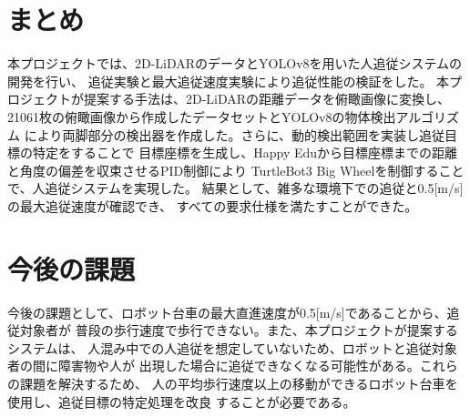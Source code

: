 \section{まとめ}
本プロジェクトでは、2D-LiDARのデータとYOLOv8を用いた人追従システムの開発を行い、
追従実験と最大追従速度実験により追従性能の検証をした。
本プロジェクトが提案する手法は、2D-LiDARの距離データを俯瞰画像に変換し、
21061枚の俯瞰画像から作成したデータセットとYOLOv8の物体検出アルゴリズム
により両脚部分の検出器を作成した。さらに、動的検出範囲を実装し追従目標の特定をすることで
目標座標を生成し、Happy Eduから目標座標までの距離と角度の偏差を収束させるPID制御により
TurtleBot3 Big Wheelを制御することで、人追従システムを実現した。
結果として、雑多な環境下での追従と0.5[m/s]の最大追従速度が確認でき、
すべての要求仕様を満たすことができた。

\section{今後の課題}
今後の課題として、ロボット台車の最大直進速度が0.5[m/s]であることから、追従対象者が
普段の歩行速度で歩行できない。また、本プロジェクトが提案するシステムは、
人混み中での人追従を想定していないため、ロボットと追従対象者の間に障害物や人が
出現した場合に追従できなくなる可能性がある。これらの課題を解決するため、
人の平均歩行速度以上の移動ができるロボット台車を使用し、追従目標の特定処理を改良
することが必要である。